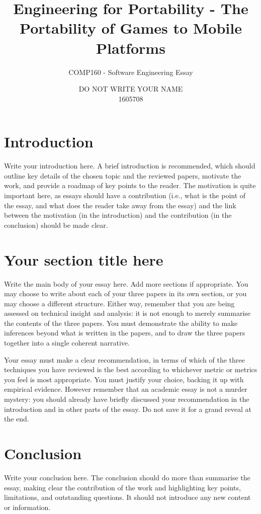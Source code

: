 \documentclass{scrartcl}
\title{Engineering for Portability - The Portability of Games to Mobile Platforms}
\subtitle{COMP160 - Software Engineering Essay}
\author{DO NOT WRITE YOUR NAME\\ 1605708}
\begin{document}
\maketitle


\section{Introduction}

Write your introduction here. A brief introduction is recommended, which should outline key details of the chosen topic and the reviewed papers, motivate the work, and provide a roadmap of key points to the reader. The motivation is quite important here, as essays should have a contribution (i.e., what is the point of the essay, and what does the reader take away from the essay) and the link between the motivation (in the introduction) and the contribution (in the conclusion) should be made clear.

\section{Your section title here}

Write the main body of your essay here. Add more sections if appropriate. You may choose to write about each of your three papers in its own section, or you may choose a different structure. Either way, remember that you are being assessed on technical insight and analysis: it is not enough to merely summarise the contents of the three papers. You must demonstrate the ability to make inferences beyond what is written in the papers, and to draw the three papers together into a single coherent narrative.

Your essay must make a clear recommendation, in terms of which of the three techniques you have reviewed is the best according to whichever metric or metrics you feel is most appropriate. You must justify your choice, backing it up with empirical evidence. However remember that an academic essay is not a murder mystery: you should already have briefly discussed your recommendation in the introduction and in other parts of the essay. Do not save it for a grand reveal at the end.

\section{Conclusion}

Write your conclusion here. The conclusion should do more than summarise the essay, making clear the contribution of the work and highlighting key points, limitations, and outstanding questions. It should not introduce any new content or information.



\end{document}
